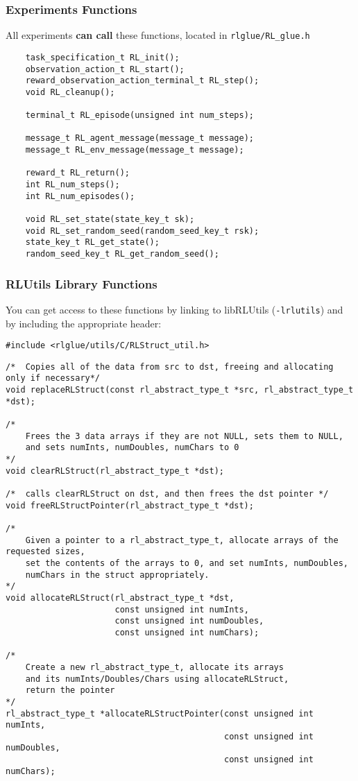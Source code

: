 \documentclass[11pt]{article}
\begin{document}
\subsubsection{Experiments Functions}
All experiments \textbf{can call} these functions, located in \texttt{rlglue/RL\_glue.h}
\begin{verbatim}
    task_specification_t RL_init();
    observation_action_t RL_start();
    reward_observation_action_terminal_t RL_step();
    void RL_cleanup();

    terminal_t RL_episode(unsigned int num_steps);

    message_t RL_agent_message(message_t message);
    message_t RL_env_message(message_t message);

    reward_t RL_return();
    int RL_num_steps();
    int RL_num_episodes();

    void RL_set_state(state_key_t sk);
    void RL_set_random_seed(random_seed_key_t rsk);
    state_key_t RL_get_state();
    random_seed_key_t RL_get_random_seed();
\end{verbatim}

\subsubsection{RLUtils Library Functions}
You can get access to these functions by linking to libRLUtils (\texttt{-lrlutils}) and by including the appropriate header:

\begin{verbatim}
#include <rlglue/utils/C/RLStruct_util.h>
\end{verbatim}

\begin{verbatim}
/*	Copies all of the data from src to dst, freeing and allocating only if necessary*/
void replaceRLStruct(const rl_abstract_type_t *src, rl_abstract_type_t *dst);

/*  
    Frees the 3 data arrays if they are not NULL, sets them to NULL, 
    and sets numInts, numDoubles, numChars to 0
*/
void clearRLStruct(rl_abstract_type_t *dst);

/*  calls clearRLStruct on dst, and then frees the dst pointer */
void freeRLStructPointer(rl_abstract_type_t *dst);

/*
    Given a pointer to a rl_abstract_type_t, allocate arrays of the requested sizes,
    set the contents of the arrays to 0, and set numInts, numDoubles,
    numChars in the struct appropriately.
*/
void allocateRLStruct(rl_abstract_type_t *dst, 
                      const unsigned int numInts,
                      const unsigned int numDoubles,
                      const unsigned int numChars);

/*
    Create a new rl_abstract_type_t, allocate its arrays 
    and its numInts/Doubles/Chars using allocateRLStruct, 
    return the pointer
*/
rl_abstract_type_t *allocateRLStructPointer(const unsigned int numInts,
                                            const unsigned int numDoubles,
                                            const unsigned int numChars);
\end{verbatim}
\end{document}

